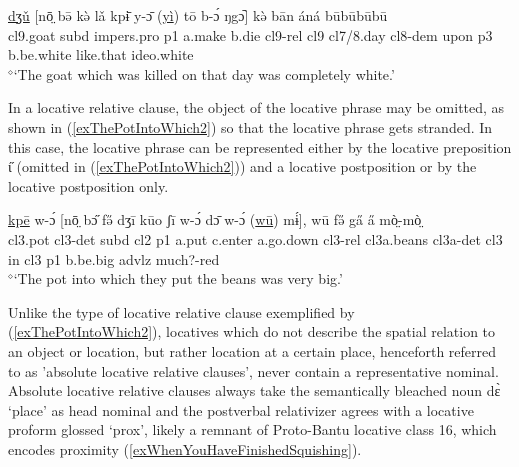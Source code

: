 \documentclass[10pt,twoside]{article}
\def\ci#1{{\ipaFont #1}}
\newcommand{\gl}[1]{`#1'}
\def\VSP{\vspace{0pt}}
\newcommand{\cl}[1]{{\sc cl#1}}
\newcommand{\pref}[1]{(\ref{#1})}
\def\elicited{$^\diamond$}
\def\ih{ɩ}
\newcommand{\comment}[1]{\textcolor{blue}{\emph{#1}}}
\begin{document}
\begin{exe} 
	\ex \label{exGoatTheyKilled2ResPro}	

		\gll	\uline{dʒǔ} [nō̤ bə̄ kə̀ lǎ kpɨ̄ y-ɔ̄ (\uline{yì}) tō b-ɔ́ ŋgɔ᷆] kə̀ bān áná būbūbūbū			\\
			\cl9.goat {\sc subd} {\sc impers.pro} {\sc p1} a.make b.die \cl9-{\sc rel} \cl9  \cl7/8.day \cl8-{\sc dem} upon {\sc p3} b.be.white like.that {\sc ideo}.white		\\
		\glt \VSP \elicited \gl{The goat which was killed on that day was completely white.}
\end{exe}%

In a locative relative clause, the object of the locative phrase may be omitted, as 
shown in \pref{exThePotIntoWhich2} so that the locative phrase 
gets stranded. In this case, the locative phrase can be represented either by the locative 
preposition \ci{\H\ih} (omitted in \pref{exThePotIntoWhich2}) and a locative postposition or by the locative postposition only.

\begin{exe}
	\ex \label{exThePotIntoWhich2}	
		\gll \uline{kpē} w-ɔ́ [nō̤ bɔ̋ fə̋ dʒī kūo ʃī w-ɔ́ dɔ̄ w-ɔ́ (\uline{wū}) mɨ́], wū fə̋ ga̋ a̋ mò̤-mò̤	\\
		\cl3.pot \cl3-{\sc det} {\sc subd} \cl2  {\sc p1} a.put c.enter a.go.down \cl3-{\sc rel} \cl3a.beans \cl3a-{\sc det} \cl3  in \cl3  {\sc p1} b.be.big {\sc advlz} much?-{\sc red} 	\\
		\glt \VSP \elicited \gl{The pot into which they put the beans was very big.}
\end{exe}%

Unlike the type of locative relative clause exemplified by \pref{exThePotIntoWhich2}, locatives which do not describe the spatial relation to an object or location, but rather location at a certain place, henceforth referred to as 'absolute locative 
relative clauses', never contain a representative nominal. Absolute locative 
relative clauses always take the semantically bleached noun \ci{dɛ̀} \gl{place} as head nominal and the 
postverbal relativizer agrees with a locative proform glossed \gl{{\sc prox}}, likely
a remnant of Proto-Bantu locative class 16, which 
encodes proximity \pref{exWhenYouHaveFinishedSquishing}. 
\end{document}
